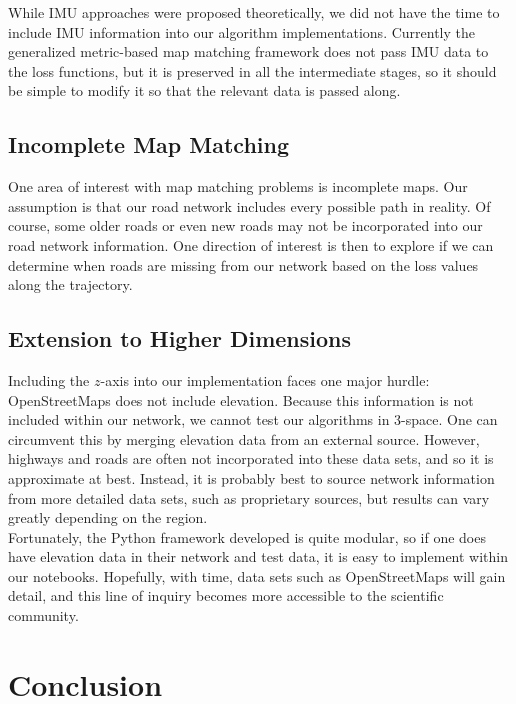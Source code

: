\documentclass{article}
\numberwithin{equation}{section}
\theoremstyle{definition}
\begin{document}
While IMU approaches were proposed theoretically, we did not have the time to include IMU information into our algorithm implementations. Currently the generalized metric-based map matching framework does not pass IMU data to the loss functions, but it is preserved in all the intermediate stages, so it should be simple to modify it so that the relevant data is passed along.

\subsection{Incomplete Map Matching}

One area of interest with map matching problems is incomplete maps. Our assumption is that our road network includes every possible path in reality. Of course, some older roads or even new roads may not be incorporated into our road network information. One direction of interest is then to explore if we can determine when roads are missing from our network based on the loss values along the trajectory.

\subsection{Extension to Higher Dimensions}

Including the $z$-axis into our implementation faces one major hurdle: OpenStreetMaps does not include elevation. Because this information is not included within our network, we cannot test our algorithms in $3$-space. One can circumvent this by merging elevation data from an external source. However, highways and roads are often not incorporated into these data sets, and so it is approximate at best. Instead, it is probably best to source network information from more detailed data sets, such as proprietary sources, but results can vary greatly depending on the region.\\

Fortunately, the Python framework developed is quite modular, so if one does have elevation data in their network and test data, it is easy to implement within our notebooks. Hopefully, with time, data sets such as OpenStreetMaps will gain detail, and this line of inquiry becomes more accessible to the scientific community.

\section{Conclusion}
\end{document}
